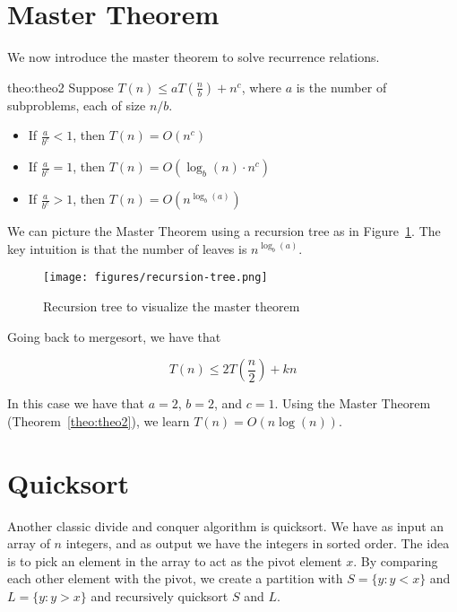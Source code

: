 
\section{Master Theorem}

We now introduce the master theorem to solve recurrence relations.


\begin{theo}{theo:theo2}
Suppose $T(n) \leq aT(\frac{n}{b}) + n^c$, where $a$ is the number of
subproblems, each of size $n/b$.
\begin{itemize}
    \item If $\frac{a}{b^c} < 1$, then $T(n) = O(n^c)$
    \item If $\frac{a}{b^c} = 1$, then $T(n) = O(\log_b(n) \cdot n^c)$
    \item If $\frac{a}{b^c} > 1$, then $T(n) = O(n^{\log_b(a)})$
\end{itemize}
\end{theo}

We can picture the Master Theorem using a recursion tree as in 
Figure~\ref{fig:recursion-tree}. The key intuition is that the number
of leaves is $n^{\log_b(a)}$.

\begin{figure}
    \centering
    \texttt{[image: figures/recursion-tree.png]}
    \caption{Recursion tree to visualize the master theorem}
    \label{fig:recursion-tree}
\end{figure}

Going back to mergesort, we have that

$$
T(n) \leq 2T(\frac{n}{2}) + kn
$$

In this case we have that $a = 2$, $b = 2$, and $c = 1$. Using
the Master Theorem (Theorem~\ref{theo:theo2}), we learn
$T(n) = O(n\log(n))$.

\section{Quicksort}

Another classic divide and conquer algorithm is quicksort. We have
as input an array of $n$ integers, and as output we have the integers
in sorted order. The idea is to pick an element in the array to act as
the pivot element $x$. By comparing each other element with the pivot,
we
create a partition with $S = \{ y : y < x \}$ and $L = \{y : y > x \}$
and recursively quicksort $S$ and $L$.

